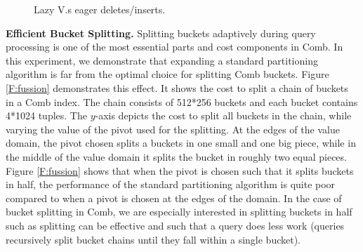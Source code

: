 \begin{figure}[t]
{\vspace{-1em}
\caption{Lazy V.s eager deletes/inserts.}
\vspace{-1em}
\label{F:LazyEager}
}
\hfill
{}
\end{figure}


\textbf{Efficient Bucket Splitting.}
Splitting buckets adaptively during query processing is one of the most essential parts and cost components in Comb.
In this experiment, we demonstrate that expanding a standard partitioning algorithm is far from the optimal choice for splitting 
Comb buckets.
Figure \ref{F:fussion} demonstrates this effect. 
It shows the cost to split a chain of buckets in a Comb index. 
The chain consists of 512*256 buckets and each bucket contains 4*1024 tuples.
The $y$-axis depicts the cost to split all buckets in the chain, while varying the value of the pivot used for the splitting.
At the edges of the value domain, the pivot chosen splits a buckets in one small and one big piece, while in the 
middle of the value domain it splits the bucket in roughly two equal pieces.
Figure \ref{F:fussion} shows that when the pivot is chosen such that it splits buckets in half, the 
performance of the standard partitioning algorithm is quite poor compared to when a pivot is chosen 
at the edges of the domain. In the case of bucket splitting in Comb, we are especially interested in splitting buckets
in half such as  splitting can be effective and such that a query does less work (queries recursively split
bucket chains until they fall within a single bucket).


